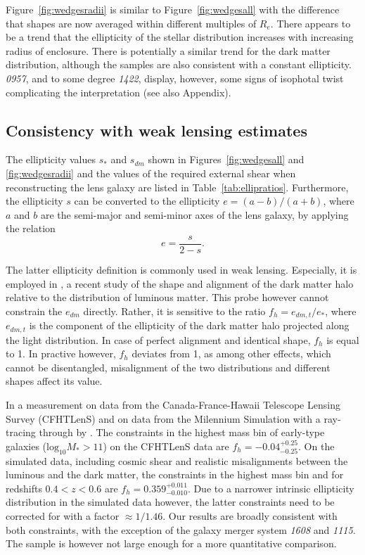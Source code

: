 \documentclass[useAMS,usenatbib]{mn2e}
\begin{document}
Figure~\ref{fig:wedgesradii} is similar to Figure~\ref{fig:wedgesall} with the difference that shapes are now averaged within different multiples of $R_e$. There appears to be a trend that the ellipticity of the stellar distribution increases with increasing radius of enclosure. There is potentially a similar trend for the dark matter distribution, although the samples are also consistent with a constant ellipticity. {\it0957}, and to some degree {\it1422}, display, however, some signs of isophotal twist complicating the interpretation (see also Appendix).

\subsection{Consistency with weak lensing estimates}
The ellipticity values $s_{*}$ and $s_{dm}$ shown in Figures~\ref{fig:wedgesall} and \ref{fig:wedgesradii} and the values of the required external shear when reconstructing the lens galaxy are listed in Table~\ref{tab:ellipratios}. Furthermore, the ellipticity $s$ can be converted to the ellipticity $e=(a-b)/(a+b)$, where $a$ and $b$ are the semi-major and semi-minor axes of the lens galaxy, by applying the relation
\begin{equation}
   e = \frac{s}{2-s}.
\end{equation}

The latter ellipticity definition is commonly used in weak lensing. Especially, it is employed in \citet{2015arXiv150704301S}, a recent study of the shape and alignment of the dark matter halo relative to the distribution of luminous matter. This probe however cannot constrain the $e_{dm}$ directly. Rather, it is sensitive to the ratio $f_{h} = e_{dm,t}/e_{*}$, where $e_{dm,t}$ is the component of the ellipticity of the dark matter halo projected along the light distribution. In case of perfect alignment and identical shape, $f_{h}$ is equal to 1. In practive however, $f_{h}$ deviates from 1, as among other effects, which cannot be disentangled, misalignment of the two distributions and different shapes affect its value.

In \citet{2015arXiv150704301S} a measurement on data from the Canada-France-Hawaii Telescope Lensing Survey (CFHTLenS) and on data from the Milennium Simulation \citep{2005Natur.435..629S} with a ray-tracing through by \citet{2009A&A...499...31H}. The constraints in the highest mass bin of early-type galaxies ($\mathrm{log_{10}}M_{*}>11$) on the CFHTLenS data are $f_{h}=-0.04^{+0.25}_{-0.25}$. On the simulated data, including cosmic shear and realistic misalignments between the luminous and the dark matter, the constraints in the highest mass bin and for redshifts $0.4<z<0.6$ are $f_{h} = 0.359^{+0.011}_{-0.010}$. Due to a narrower intrinsic ellipticity distribution in the simulated data however, the latter constraints need to be corrected for with a factor $\approx 1/1.46$. Our results are broadly consistent with both constraints, with the exception of the galaxy merger system \textit{1608} and \textit{1115}. The sample is however not large enough for a more quantitative comparison.
\end{document}
